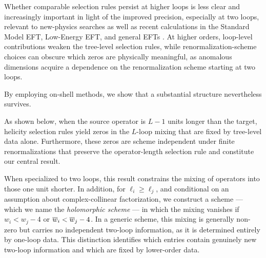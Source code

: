 Whether comparable selection rules persist at higher loops is less clear and increasingly important in light of
the improved precision, especially at two loops, relevant to new-physics searches
\cite{Allwicher:2023aql,Stefanek:2024kds,Haisch:2024wnw,Olgoso:2025jot,Mantani:2026fao,Born:2026tgm,Haisch:2026eyq}
as well as
recent calculations in the Standard Model EFT, Low-Energy EFT, and general EFTs
\cite{Born:2026xkr,Ibarra:2024tpt,Zhang:2025ywe,DiNoi:2025tka,Aebischer:2022anv,Born:2024mgz,DiNoi:2024ajj,Duhr:2025zqw,DiNoi:2025arz,Haisch:2025lvd,Haisch:2025vqj,Duhr:2025yor,Banik:2025wpi,Naterop:2024cfx,Naterop:2025lzc,Naterop:2025cwg,Aebischer:2025hsx,Jenkins:2023bls,EliasMiro:2021jgu,Guedes:2025sax,Aebischer:2026zxv,Fonseca:2025zjb,Fonseca:2025cls,Misiak:2025xzq,Aebischer:2025zxg,Aebischer:2025ddl,Henriksson:2025hwi,Henriksson:2025vyi}.
%
At higher orders, loop-level contributions weaken the tree-level selection rules, while renormalization-scheme choices can obscure which zeros are physically meaningful, as anomalous dimensions acquire a dependence on the renormalization scheme starting at two loops.
%

By employing on-shell methods,
we show that a substantial structure nevertheless survives.

As shown below, when the source operator is $L-1$ units longer than the target, helicity selection
rules yield zeros in the $L$-loop mixing that are fixed by tree-level data alone. Furthermore, these
zeros are scheme independent under finite renormalizations that preserve the operator-length
selection rule \cite{Bern:2019wie} and constitute our central result.

When specialized to two loops, this result constrains the mixing of operators into those one unit
shorter. In addition, for $\ell_i\ge\ell_j$, and conditional on an assumption about complex-collinear
factorization, we construct a scheme --- which we name the \textit{holomorphic scheme} --- in which
the mixing vanishes if $w_i<w_j-4$ or $\overline{w}_i<\overline{w}_j-4$.
In a generic scheme, this mixing is generally non-zero but carries no independent two-loop
information, as it is determined entirely by one-loop data. This distinction identifies which entries
contain genuinely new two-loop information and which are fixed by lower-order data.

